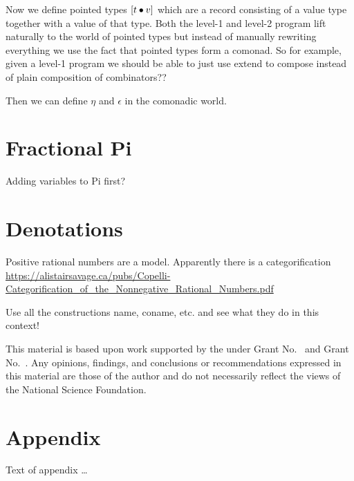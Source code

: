 \documentclass[sigplan,10pt,review,anonymous]{acmart}
\begin{document}
Now we define pointed types $[t \bullet v]$ which are a record
consisting of a value type together with a value of that type. Both
the level-1 and level-2 program lift naturally to the world of pointed
types but instead of manually rewriting everything we use the fact
that pointed types form a comonad. So for example, given a level-1
program we should be able to just use \textsf{extend} to compose
instead of plain composition of combinators??

Then we can define $\eta$ and $\epsilon$ in the comonadic world.





 
\section{Fractional Pi}

Adding variables to Pi first? 
 
\section{Denotations}
 
Positive rational numbers are a model. Apparently there is a categorification \url{https://alistairsavage.ca/pubs/Copelli-Categorification_of_the_Nonnegative_Rational_Numbers.pdf}

Use all the constructions name, coname, etc. and see what they do in this context!


\begin{acks}                            %
  This material is based upon work supported by the
   under Grant
  No.~ and Grant
  No.~.  Any opinions, findings, and
  conclusions or recommendations expressed in this material are those
  of the author and do not necessarily reflect the views of the
  National Science Foundation.
\end{acks}


%


\appendix
\section{Appendix}

Text of appendix \ldots
\end{document}
